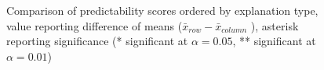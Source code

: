\begin{figure}[H]
{\begin{minipage}[t]{0.65\textwidth}
			\caption{Comparison of predictability scores ordered by explanation type, value reporting difference of means ($\bar{x}_{row} - \bar{x}_{column}$ ), asterisk reporting significance (* significant at $\alpha=0.05$, ** significant at $\alpha=0.01$)}
			\label{fig:results_matrix_predictability_reordered}
	\end{minipage}}
\end{figure}




